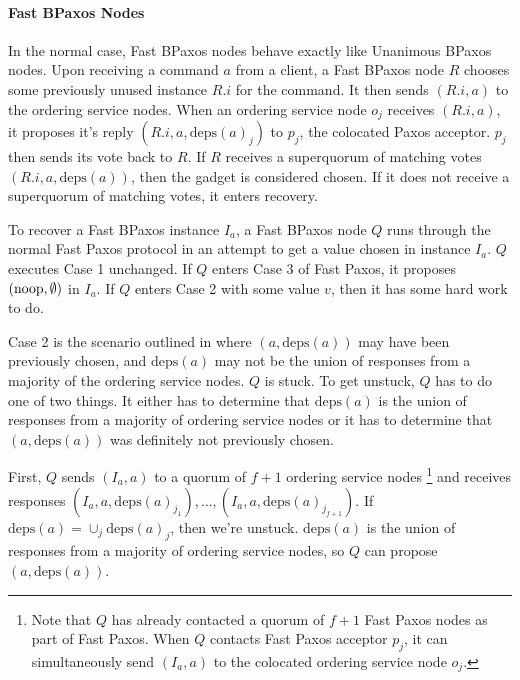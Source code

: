 \documentclass{mwhittaker}
\theoremstyle{definition}
\newcommand{\deps}[1]{\text{deps}(#1)}
\begin{document}
\paragraph{Fast BPaxos Nodes}
In the normal case, Fast BPaxos nodes behave exactly like Unanimous BPaxos
nodes. Upon receiving a command $a$ from a client, a Fast BPaxos node $R$
chooses some previously unused instance $R.i$ for the command. It then sends
$(R.i, a)$ to the ordering service nodes.
%
When an ordering service node $o_j$ receives $(R.i, a)$, it proposes it's reply
$(R.i, a, \deps{a}_j)$ to $p_j$, the colocated Paxos acceptor. $p_j$ then sends
its vote back to $R$.
%
If $R$ receives a superquorum of matching votes $(R.i, a, \deps{a})$, then the
gadget is considered chosen. If it does not receive a superquorum of matching
votes, it enters recovery.

%

To recover a Fast
BPaxos instance $I_a$, a Fast BPaxos node $Q$ runs through the normal Fast
Paxos protocol in an attempt to get a value chosen in instance $I_a$. $Q$
executes Case 1 unchanged. If $Q$ enters Case 3 of Fast Paxos, it proposes
$(\text{noop}, \emptyset)$ in $I_a$. If $Q$ enters Case 2 with some value $v$, then
it has some hard work to do.

Case 2 is the scenario outlined in  where $(a, \deps{a})$
may have been previously chosen, and $\deps{a}$ may not be the union of
responses from a majority of the ordering service nodes. $Q$ is stuck. To get
unstuck, $Q$ has to do one of two things. It either has to determine that
$\deps{a}$ is the union of responses from a majority of ordering service nodes
or it has to determine that $(a, \deps{a})$ was definitely not previously
chosen.

First, $Q$ sends $(I_a, a)$ to a quorum of $f + 1$ ordering service nodes%
\footnote{%
  Note that $Q$ has already contacted a quorum of $f + 1$ Fast Paxos nodes as
  part of Fast Paxos. When $Q$ contacts Fast Paxos acceptor $p_j$, it can
  simultaneously send $(I_a, a)$ to the colocated ordering service node $o_j$.
}
and receives responses $(I_a, a, \deps{a}_{j_1}), \ldots, (I_a, a,
\deps{a}_{j_{f+1}})$. If $\deps{a} = \cup_j \deps{a}_j$, then we're unstuck.
$\deps{a}$ is the union of responses from a majority of ordering service nodes,
so $Q$ can propose $(a, \deps{a})$.
\end{document}
